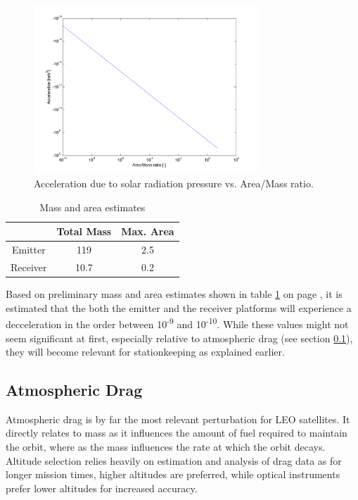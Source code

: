 \begin{figure}[h!]
\centering
\includegraphics[width=0.75\textwidth, angle=0]{chapters/img/solPressureVarRatio.png}
\caption{Acceleration due to solar radiation pressure vs. Area/Mass ratio.}
\label{fig:solarRadRatio}
\end{figure}

\begin{table}[h]
	\centering
		\begin{tabular}{c|c|c}
		 & Total Mass & Max. Area \\ \hline \hline
		 Emitter & 119 & 2.5 \\ 
		 Receiver & 10.7 & 0.2 
			
		\end{tabular}
	\caption{Mass and area estimates}
	\label{table:solarEstimates}
\end{table}

Based on preliminary mass and area estimates shown in table \ref{table:solarEstimates} on page \pageref{table:solarEstimates}, it is estimated that the both the emitter and the receiver platforms will experience a decceleration in the order between 10\textsuperscript{-9} and 10\textsuperscript{-10}. While these values might not seem significant at first, especially relative to atmospheric drag (see section \ref{mtrAtmDrag}), they will become relevant for stationkeeping as explained earlier.

\subsection{Atmospheric Drag}
\label{mtrAtmDrag}
Atmospheric drag is by far the most relevant perturbation for \ac{LEO} satellites. It directly relates to mass as it influences the amount of fuel required to maintain the orbit, where as the mass influences the rate at which the orbit decays. Altitude selection relies heavily on estimation and analysis of drag data as for longer mission times, higher altitudes are preferred, while optical instruments prefer lower altitudes for increased accuracy.

